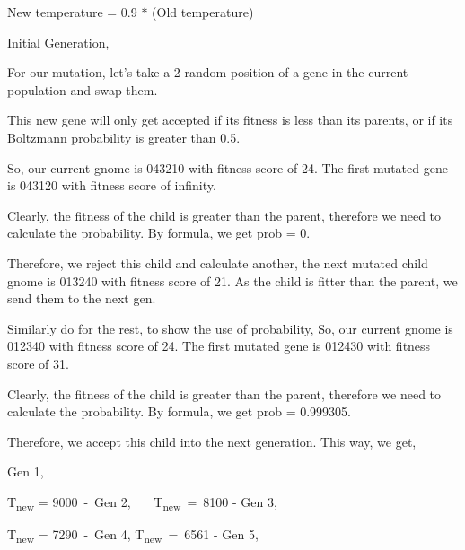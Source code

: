 \documentclass[12pt]{article}
\renewcommand{\_}{\kern-1.5pt\textunderscore\kern-1.5pt}
\begin{document}
New temperature = 0.9 $\ast$  (Old temperature)\par

Initial Generation, \par

\par

For our mutation, let’s take a 2 random position of a gene in the current population and swap them. \par

This new gene will only get accepted if its fitness is less than its parents, or if its Boltzmann probability is greater than 0.5. \par

So, our current gnome is 043210 with fitness score of 24. The first mutated gene is 043120 with fitness score of infinity. \par

Clearly, the fitness of the child is greater than the parent, therefore we need to calculate the probability. By formula, we get prob = 0. \par

Therefore, we reject this child and calculate another, the next mutated child gnome is 013240 with fitness score of 21. As the child is fitter than the parent, we send them to the next gen. \par

Similarly do for the rest, to show the use of probability, So, our current gnome is 012340 with fitness score of 24. The first mutated gene is 012430 with fitness score of 31. \par

Clearly, the fitness of the child is greater than the parent, therefore we need to calculate the probability. By formula, we get prob = 0.999305. \par

Therefore, we accept this child into the next generation. This way, we get, \par

Gen 1, \par

\par

T\textsubscript{new} = 9000\  -\  Gen 2, \tab \tab \tab \ \ \  T\textsubscript{new}\ =\ 8100  -  Gen 3, \par

\tab \tab \tab \par


\vspace{\baselineskip}
T\textsubscript{new} = 7290\  -\  Gen 4, \tab \tab \tab T\textsubscript{new}\ =\ 6561  -  Gen 5, \par
\end{document}
